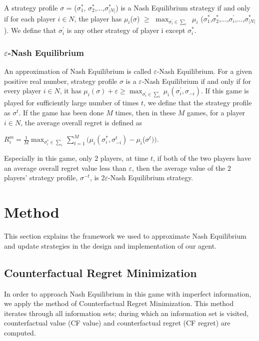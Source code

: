 \documentclass{article}
\begin{document}
A strategy profile $\sigma$ = ($\sigma_1^*$, $\sigma_2^*$,...,$\sigma_{|N|}^*$) is a Nash Equilibrium strategy if and only if for each player $i \in N$, the player has $\mu_i$($\sigma$) $\geq$ $\max_{\sigma_i^\prime \in \sum_i}$ $\mu_i$ ($\sigma_1^*$,$\sigma_2^*$,...,$\sigma_i^\prime$,...,$\sigma_{|N|}^*$). We define that $\sigma_i^\prime$ is any other strategy of player i except $\sigma_i^*$.

\subsubsection{$\varepsilon$-Nash Equilibrium}

An approximation of Nash Equilibrium is called $\varepsilon$-Nash Equilibrium. For a given positive real number, strategy profile $\sigma$ is a $\varepsilon$-Nash Equilibrium if and only if for every player $i \in N$, it has 
$\mu_i(\sigma) + \varepsilon \geq \max_{\sigma_i^\prime \in \sum_i} \mu_i(\sigma_i^\prime, \sigma_{-i})$. 
If this game is played for sufficiently large number of times $t$, we define that the strategy profile as $\sigma^t$. If the game has been done $M$ times, then in these $M$ games, for a player $i \in N$, the average overall regret is defined as 

$R_i^m = \frac{1}{M} \max_{\sigma_i^* \in \sum_i}
\sum_{t=1}^M (\mu_i(\sigma_i^*, \sigma_{-i}^t) - \mu_i$($\sigma^t))$.

Especially in this game, only 2 players, at time $t$, if both of the two players have an average overall regret value less than $\varepsilon$, then the average value of the 2 players' strategy profile, $\sigma^{-t}$, is 2$\varepsilon$-Nash Equilibrium strategy.

\section{Method}

This section explains the framework we used to approximate Nash Equilibrium and update strategies in the design and implementation of our agent.

\subsection{Counterfactual Regret Minimization}

In order to approach Nash Equilibrium in this game with imperfect information, we apply the method of Counterfactual Regret Minimization. This method iterates through all information sets; during which an information set is visited, counterfactual value (CF value) and counterfactual regret (CF regret) are computed.
\end{document}
